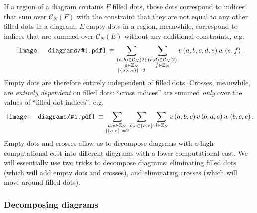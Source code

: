 \documentclass[nofootinbib,notitlepage,11pt]{revtex4-2}
\newcommand{\f}[2]{\dfrac{#1}{#2}} %
\newcommand{\p}[1]{\left(#1\right)} %
\renewcommand{\set}[1]{\left\{#1\right\}} %
\newcommand{\1}{\mathds{1}}
\newcommand{\C}{\mathcal{C}}
\newcommand{\ZZ}{\mathbb{Z}}
\newcommand{\diagram}[1]
{\,\texttt{[image: diagrams/\#1.pdf]}\,}
\begin{document}
If a region of a diagram contains $F$ filled dots, those dots
correspond to indices that sum over $\C_N\p{F}$ with the constraint
that they are not equal to any other filled dots in a diagram.  $E$
empty dots in a region, meanwhile, correspond to indices that are
summed over $\C_N\p{E}$ without any additional constraints, e.g.
\begin{align}
  \diagram{example_o}
  \equiv \sum_{\substack{\p{a,b}\in\C_N\p{2}\\e\in\ZZ_N\\
      \abs{\set{a,b,e}}=3}}
  \sum_{\substack{\p{c,d}\in\C_N\p{2}\\f\in\ZZ_N}}
  v\p{a,b,c,d,e} w\p{e,f}.
\end{align}
Empty dots are therefore entirely independent of filled dots.
Crosses, meanwhile, are {\it entirely dependent} on filled dots:
``cross indices'' are summed {\it only} over the values of ``filled
dot indices'', e.g.
\begin{align}
  \diagram{example_x}
  \equiv \sum_{\substack{a,e\in\ZZ_N\\\abs{\set{a,e}}=2}}
  \sum_{b,c\in\set{a,e}} \sum_{d\in\ZZ_N}
  u\p{a,b,c} v\p{b,d,e} w\p{b,c,e}.
\end{align}
Empty dots and crosses allow us to decompose diagrams with a high
computational cost into different diagrams with a lower computational
cost.  We will essentially use two tricks to decompose diagrams:
eliminating filled dots (which will add empty dots and crosses), and
eliminating crosses (which will move around filled dots).

\subsubsection{Decomposing diagrams}
\end{document}

